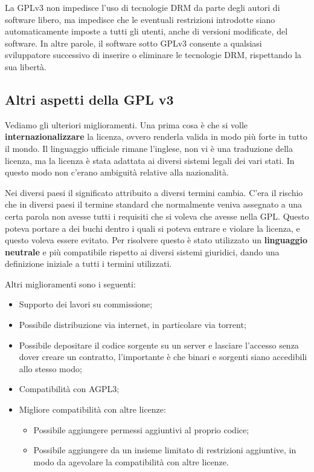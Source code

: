 La GPLv3 non impedisce l'uso di tecnologie DRM da parte degli autori di software libero, ma impedisce che le eventuali restrizioni introdotte siano automaticamente imposte a tutti gli utenti, anche di versioni modificate, del software. In altre parole, il software sotto GPLv3 consente a qualsiasi sviluppatore successivo di inserire o eliminare le tecnologie DRM, rispettando la sua libertà.


\subsection{Altri aspetti della GPL v3}

Vediamo gli ulteriori miglioramenti. Una prima cosa è che si volle \textbf{internazionalizzare} la licenza, ovvero renderla valida in modo più forte in tutto il mondo. Il linguaggio ufficiale rimane l'inglese, non vi è una traduzione della licenza, ma la licenza è stata adattata ai diversi sistemi legali dei vari stati. In questo modo non c'erano ambiguità relative alla nazionalità. 

Nei diversi paesi il significato attribuito a diversi termini cambia. C'era il rischio che in diversi paesi il termine standard che normalmente veniva assegnato a una certa parola non avesse tutti i requisiti che si voleva che avesse nella GPL. Questo poteva portare a dei buchi dentro i quali si poteva entrare e violare la licenza, e questo voleva essere evitato. Per risolvere questo è stato utilizzato un \textbf{linguaggio neutrale} e più compatibile rispetto ai diversi sistemi giuridici, dando una definizione iniziale a tutti i termini utilizzati.

Altri miglioramenti sono i seguenti:

\begin{itemize}

\item Supporto dei lavori su commissione;
\item Possibile distribuzione via internet, in particolare via torrent;
\item Possibile depositare il codice sorgente su un server e lasciare l'accesso senza dover creare un contratto, l'importante è che binari e sorgenti siano accedibili allo stesso modo;
\item Compatibilità con AGPL3;
\item Migliore compatibilità con altre licenze:

  \begin{itemize}
  \item Possibile aggiungere permessi aggiuntivi al proprio codice;
  \item Possibile aggiungere da un insieme limitato di restrizioni aggiuntive, in modo da agevolare la compatibilità con altre licenze.
  \end{itemize}

\end{itemize}

